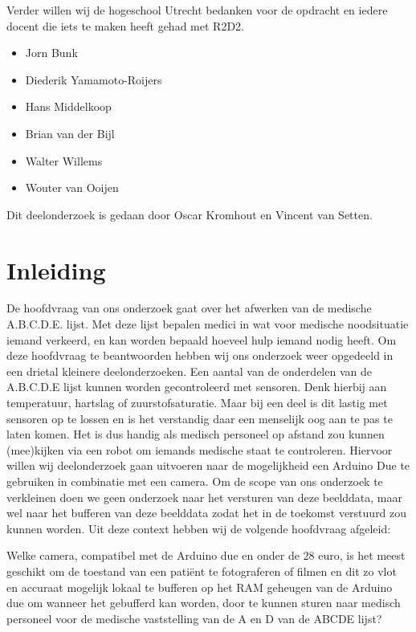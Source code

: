 \documentclass{article}
\begin{document}
Verder willen wij de hogeschool Utrecht bedanken voor de opdracht en iedere docent die iets te maken heeft gehad met R2D2.

\begin{itemize}
	\item Jorn Bunk
	\item Diederik Yamamoto-Roijers 
	\item Hans Middelkoop
	\item Brian van der Bijl 
	\item Walter Willems 
	\item Wouter van Ooijen
\end{itemize}

Dit deelonderzoek is gedaan door Oscar Kromhout en Vincent van Setten.

\section{Inleiding}
De hoofdvraag van ons onderzoek gaat over het afwerken van de medische A.B.C.D.E. lijst. Met deze lijst bepalen medici in wat voor medische noodsituatie iemand verkeerd, en kan worden bepaald hoeveel hulp iemand nodig heeft. Om deze hoofdvraag te beantwoorden hebben wij ons onderzoek weer opgedeeld in een drietal kleinere deelonderzoeken.  
Een aantal van de onderdelen van de A.B.C.D.E lijst kunnen worden gecontroleerd met sensoren. Denk hierbij aan temperatuur, hartslag of zuurstofsaturatie. Maar bij een deel is dit lastig met sensoren op te lossen en is het verstandig daar een menselijk oog aan te pas te laten komen. Het is dus handig als medisch personeel op afstand zou kunnen (mee)kijken via een robot om iemands medische staat te controleren. Hiervoor willen wij deelonderzoek gaan uitvoeren naar de mogelijkheid een Arduino Due te gebruiken in combinatie met een camera. Om de scope van ons onderzoek te verkleinen doen we geen onderzoek naar het versturen van deze beelddata, maar wel naar het bufferen van deze beelddata zodat het in de toekomst verstuurd zou kunnen worden. 
Uit deze context hebben wij de volgende hoofdvraag afgeleid: 

Welke camera, compatibel met de Arduino due en onder de 28 euro, is het meest geschikt om de toestand van een patiënt te fotograferen of filmen en dit zo vlot en accuraat mogelijk lokaal te bufferen op het RAM geheugen van de Arduino due om wanneer het gebufferd kan worden, door te kunnen sturen naar medisch personeel voor de medische vaststelling van de A en D van de ABCDE lijst? 
\end{document}
